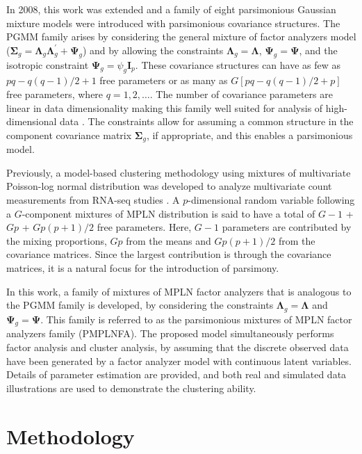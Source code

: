\documentclass[12pt]{article}
\newcommand{\vecI}{\mathbf{I}}
\begin{document}
In 2008, this work was extended and a family of eight parsimonious Gaussian mixture models \citep[PGMMs;][]{mcnicholas2008} were introduced with parsimonious covariance structures. The PGMM family arises by considering the general mixture of factor analyzers model ($\mathbf{\Sigma}_g = \mathbf{\Lambda}_g  \mathbf{\Lambda}_g^{\prime} + \mathbf{\Psi}_g $) and by allowing the constraints $\mathbf{\Lambda}_g = \mathbf{\Lambda}$, $\mathbf{\Psi}_g = \mathbf{\Psi}$, and the isotropic constraint $\mathbf{\Psi}_g = \psi_{g}\vecI_p$. These covariance structures can have as few as $pq - q(q - 1)/2 + 1$ free parameters or as many as $G[pq - q(q - 1)/2 + p]$ free parameters, where $q = 1, 2, \ldots$. The number of covariance parameters are linear in data dimensionality making this family well suited for analysis of high-dimensional data \citep{mcnicholas2010}. The constraints allow for assuming a common structure in the component covariance matrix $\mathbf{\Sigma}_g$, if appropriate, and this enables a parsimonious model. 

Previously, a model-based clustering methodology using mixtures of multivariate Poisson-log normal distribution \citep[MPLN;][]{aitchison1989} was developed to analyze multivariate count measurements from RNA-seq studies \citep{Silva2017}. A $p$-dimensional random variable following a $G$-component mixtures of MPLN distribution is said to have a total of $G-1$ + $Gp$ + $Gp(p+1)/2$ free parameters. Here, $G-1$ parameters are contributed by the mixing proportions, $Gp$ from the means and $Gp(p+1)/2$ from the covariance matrices. Since the largest contribution is through the covariance matrices, it is a natural focus for the introduction of parsimony. 

In this work, a family of mixtures of MPLN factor analyzers that is analogous to the PGMM family is developed, by considering the constraints $\mathbf{\Lambda}_g = \mathbf{\Lambda}$ and $\mathbf{\Psi}_g = \mathbf{\Psi}$. This family is referred to as the parsimonious mixtures of MPLN factor analyzers family (PMPLNFA). The proposed model simultaneously performs factor analysis and cluster analysis, by assuming that the discrete observed data have been generated by a factor analyzer model with continuous latent variables. Details of parameter estimation are provided, and both real and simulated data illustrations are used to demonstrate the clustering ability.

\section{Methodology}
\end{document}
